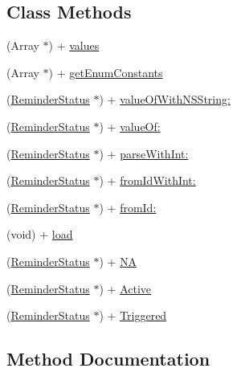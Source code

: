 \subsection*{Class Methods}
\begin{DoxyCompactItemize}
\item 
(Array $\ast$) + \hyperlink{interface_reminder_status_aacc82dbb73796c7269fe2e3f4d79072d}{values}
\item 
(Array $\ast$) + \hyperlink{interface_reminder_status_aca1bd1f5d6269678670dee0bf8389e0f}{get\+Enum\+Constants}
\item 
(\hyperlink{interface_reminder_status}{Reminder\+Status} $\ast$) + \hyperlink{interface_reminder_status_a7064143381885d4b5536deb587549035}{value\+Of\+With\+N\+S\+String\+:}
\item 
(\hyperlink{interface_reminder_status}{Reminder\+Status} $\ast$) + \hyperlink{interface_reminder_status_a92cbd6d5c3fe3eacc298886d8c5bb10c}{value\+Of\+:}
\item 
(\hyperlink{interface_reminder_status}{Reminder\+Status} $\ast$) + \hyperlink{interface_reminder_status_a6a5ed191af51f56499d61c1934983963}{parse\+With\+Int\+:}
\item 
(\hyperlink{interface_reminder_status}{Reminder\+Status} $\ast$) + \hyperlink{interface_reminder_status_a829ee84c5e99eb8638b17b244c2f6050}{from\+Id\+With\+Int\+:}
\item 
(\hyperlink{interface_reminder_status}{Reminder\+Status} $\ast$) + \hyperlink{interface_reminder_status_a6e2bb1d72ca5425435ffa1b11fbf7172}{from\+Id\+:}
\item 
(void) + \hyperlink{interface_reminder_status_aa5186ec62da7951b3b8683278f4304a6}{load}
\item 
(\hyperlink{interface_reminder_status}{Reminder\+Status} $\ast$) + \hyperlink{interface_reminder_status_ad5b18fe560a8536a6ca67b3736d57cbf}{N\+A}
\item 
(\hyperlink{interface_reminder_status}{Reminder\+Status} $\ast$) + \hyperlink{interface_reminder_status_a687076acfbd106692b1a784a0782e2af}{Active}
\item 
(\hyperlink{interface_reminder_status}{Reminder\+Status} $\ast$) + \hyperlink{interface_reminder_status_a0589243c8a680fa3f44bc5a73db22681}{Triggered}
\end{DoxyCompactItemize}


\subsection{Method Documentation}
\hypertarget{interface_reminder_status_a687076acfbd106692b1a784a0782e2af}{}

